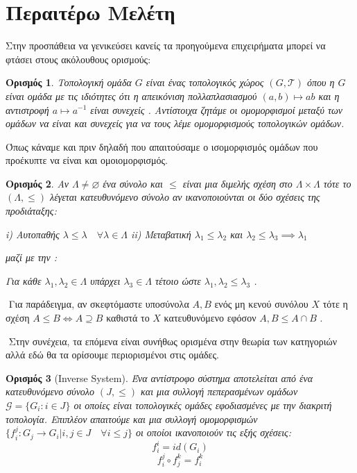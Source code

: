 \documentclass[oneside,a4paper]{article}
\newtheorem*{defn}{Ορισμός}
\newcommand {\tl}{\textlatin}
\begin{document}
\pagebreak
\section{Περαιτέρω Μελέτη}


Στην προσπάθεια να γενικεύσει κανείς τα προηγούμενα επιχειρήματα μπορεί να φτάσει στους ακόλουθους ορισμούς:

\begin{defn}Τοπολογική ομάδα $G$ είναι ένας τοπολογικός χώρος $(G,\mathcal T )$ όπου η $G$ είναι ομάδα με τις ιδιότητες ότι η απεικόνιση πολλαπλασιασμού $(a,b) \mapsto ab$ και η αντιστροφή $a \mapsto a^{-1}$ είναι συνεχείς . Αντίστοιχα ζητάμε οι ομομορφισμοί μεταξύ των ομάδων να είναι και συνεχείς για να τους λέμε ομομορφισμούς τοπολογικών ομάδων.
\end{defn}

\noindent Όπως κάναμε και πριν δηλαδή που απαιτούσαμε ο ισομορφισμός ομάδων που προέκυπτε να είναι και ομοιομορφισμός.

\begin{defn} Αν $\Lambda\neq \varnothing$ ένα σύνολο και $\leq$ είναι μια διμελής σχέση στο $\Lambda \times \Lambda$ τότε το $(\Lambda , \leq )$ λέγεται κατευθυνόμενο σύνολο αν ικανοποιούνται οι δύο σχέσεις της προδιάταξης:

i) Αυτοπαθής $\lambda \leq \lambda \quad\forall \lambda \in \Lambda$
ii) Μεταβατική $\lambda_1 \leq \lambda_2$ και  $\lambda_2 \leq \lambda_3 \implies \lambda_1$ 

μαζί με την :

Για κάθε $\lambda_1 , \lambda_2 \in \Lambda$ υπάρχει $\lambda_3 \in \Lambda$ τέτοιο ώστε $\lambda_1, \lambda_2 \leq \lambda_3$ .
\end{defn}

$ $\newline
\noindent Για παράδειγμα, αν σκεφτόμαστε υποσύνολα $A,B$ ενός μη κενού συνόλου $X$ τότε η σχέση $A\leq B \iff A\supseteq B$ καθιστά το $X$ κατευθυνόμενο εφόσον $A, B \leq A\cap B$ .

$ $\newline
\noindent Στην συνέχεια, τα επόμενα είναι συνήθως ορισμένα στην θεωρία των κατηγοριών αλλά εδώ θα τα ορίσουμε περιορισμένοι στις ομάδες.

\begin{defn}[\tl{Inverse System}] Ένα αντίστροφο σύστημα αποτελείται από ένα κατευθυνόμενο σύνολο $(J,\leq )$ και μια συλλογή πεπερασμένων ομάδων $\mathcal{G} = \{G_i : i \in J\}$ οι οποίες είναι τοπολογικές ομάδες εφοδιασμένες με την διακριτή τοπολογία. Επιπλέον απαιτούμε και μια συλλογή ομομορφισμών $\{f^j_i : G_j \rightarrow G_i | i,j \in J \quad\forall i\leq j\}$ οι οποίοι ικανοποιούν τις εξής σχέσεις:
$$f^i_i = id(G_i)$$
$$f^j_i \circ f^k_j = f^k_i$$
\end{defn}
\end{document}
